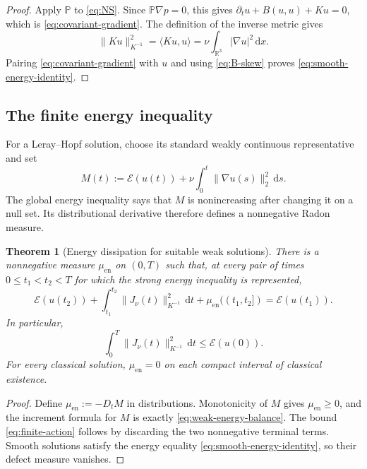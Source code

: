 \documentclass[11pt]{amsart}
\numberwithin{equation}{section}
\theoremstyle{plain}
\newtheorem{theorem}{Theorem}[section]
\theoremstyle{definition}
\theoremstyle{remark}
\newcommand{\R}{\mathbb R}
\newcommand{\dd}{\,\mathrm d}
\newcommand{\Pdiv}{\mathbb P}
\newcommand{\Energy}{\mathcal E}
\begin{document}
\begin{proof}
Apply \(\Pdiv\) to \eqref{eq:NS}.  Since \(\Pdiv\nabla p=0\), this gives
\(\partial_t u+B(u,u)+Ku=0\), which is
\eqref{eq:covariant-gradient}.  The definition of the inverse metric gives
\[
 \|Ku\|_{K^{-1}}^2=\langle Ku,u\rangle
 =\nu\int_{\R^3}|\nabla u|^2\dd x.
\]
Pairing \eqref{eq:covariant-gradient} with \(u\) and using
\eqref{eq:B-skew} proves \eqref{eq:smooth-energy-identity}.
\end{proof}

\subsection{The finite energy inequality}

For a Leray--Hopf solution, choose its standard weakly continuous
representative and set
\begin{equation}\label{eq:energy-balance}
 M(t):=\Energy(u(t))+\nu\int_0^t\|\nabla u(s)\|_2^2\dd s.
\end{equation}
The global energy inequality says that \(M\) is nonincreasing after changing
it on a null set.  Its distributional derivative therefore defines a
nonnegative Radon measure.

\begin{theorem}[Energy dissipation for suitable weak solutions]
\label{thm:weak-energy-balance}
There is a nonnegative measure \(\mu_{\mathrm{en}}\) on \((0,T)\) such that,
at every pair of times \(0\le t_1<t_2<T\) for which the strong energy
inequality is represented,
\begin{equation}\label{eq:weak-energy-balance}
 \Energy(u(t_2))
 +\int_{t_1}^{t_2}\|J_\nu(t)\|_{K^{-1}}^2\dd t
 +\mu_{\mathrm{en}}((t_1,t_2])
 =\Energy(u(t_1)).
\end{equation}
In particular,
\begin{equation}\label{eq:finite-action}
 \int_0^T\|J_\nu(t)\|_{K^{-1}}^2\dd t
 \le\Energy(u(0)).
\end{equation}
For every classical solution,
\(\mu_{\mathrm{en}}=0\) on each compact interval of classical existence.
\end{theorem}

\begin{proof}
Define \(\mu_{\mathrm{en}}:=-D_tM\) in distributions.  Monotonicity of \(M\) gives
\(\mu_{\mathrm{en}}\ge0\), and the increment formula for \(M\) is exactly
\eqref{eq:weak-energy-balance}.  The bound \eqref{eq:finite-action} follows by
discarding the two nonnegative terminal terms.  Smooth solutions satisfy the
energy equality \eqref{eq:smooth-energy-identity}, so their defect measure
vanishes.
\end{proof}
\end{document}
